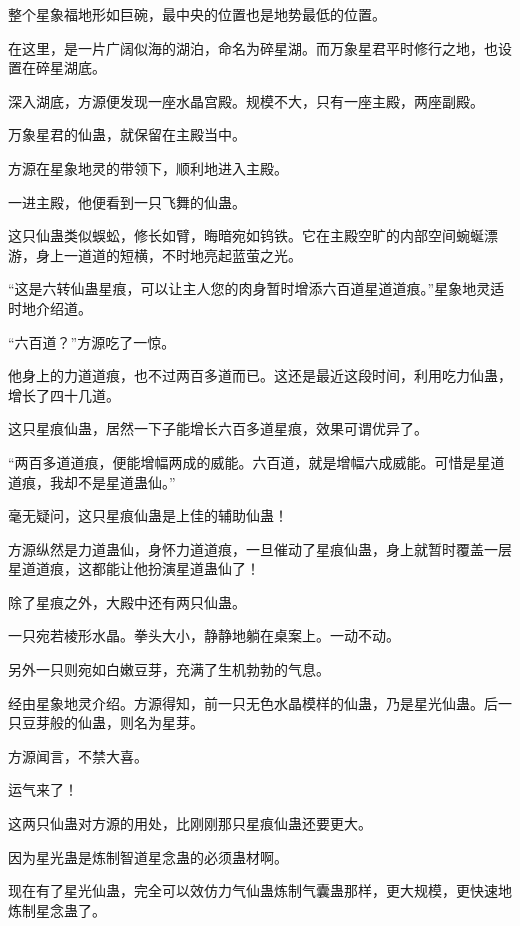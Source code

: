 
\begin{this_body}

整个星象福地形如巨碗，最中央的位置也是地势最低的位置。

在这里，是一片广阔似海的湖泊，命名为碎星湖。而万象星君平时修行之地，也设置在碎星湖底。

深入湖底，方源便发现一座水晶宫殿。规模不大，只有一座主殿，两座副殿。

万象星君的仙蛊，就保留在主殿当中。

方源在星象地灵的带领下，顺利地进入主殿。

一进主殿，他便看到一只飞舞的仙蛊。

这只仙蛊类似蜈蚣，修长如臂，晦暗宛如钨铁。它在主殿空旷的内部空间蜿蜒漂游，身上一道道的短横，不时地亮起蓝萤之光。

“这是六转仙蛊星痕，可以让主人您的肉身暂时增添六百道星道道痕。”星象地灵适时地介绍道。

“六百道？”方源吃了一惊。

他身上的力道道痕，也不过两百多道而已。这还是最近这段时间，利用吃力仙蛊，增长了四十几道。

这只星痕仙蛊，居然一下子能增长六百多道星痕，效果可谓优异了。

“两百多道道痕，便能增幅两成的威能。六百道，就是增幅六成威能。可惜是星道道痕，我却不是星道蛊仙。”

毫无疑问，这只星痕仙蛊是上佳的辅助仙蛊！

方源纵然是力道蛊仙，身怀力道道痕，一旦催动了星痕仙蛊，身上就暂时覆盖一层星道道痕，这都能让他扮演星道蛊仙了！

除了星痕之外，大殿中还有两只仙蛊。

一只宛若棱形水晶。拳头大小，静静地躺在桌案上。一动不动。

另外一只则宛如白嫩豆芽，充满了生机勃勃的气息。

经由星象地灵介绍。方源得知，前一只无色水晶模样的仙蛊，乃是星光仙蛊。后一只豆芽般的仙蛊，则名为星芽。

方源闻言，不禁大喜。

运气来了！

这两只仙蛊对方源的用处，比刚刚那只星痕仙蛊还要更大。

因为星光蛊是炼制智道星念蛊的必须蛊材啊。

现在有了星光仙蛊，完全可以效仿力气仙蛊炼制气囊蛊那样，更大规模，更快速地炼制星念蛊了。


\end{this_body}
